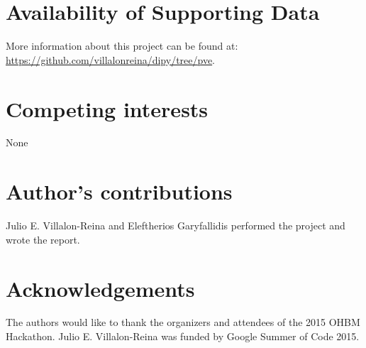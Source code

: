 \documentclass[twocolumn]{bmcart}%
\begin{document}
\begin{backmatter}

\section*{Availability of Supporting Data}
More information about this project can be found at: \url{https://github.com/villalonreina/dipy/tree/pve}. 

\section*{Competing interests}
None

\section*{Author's contributions}
Julio E. Villalon-Reina and Eleftherios Garyfallidis performed the project and wrote the report.

\section*{Acknowledgements}
The authors would like to thank the organizers and attendees of the 2015
OHBM Hackathon. Julio E. Villalon-Reina was funded by Google Summer of Code 2015. 

  
  


\end{backmatter}
\end{document}

